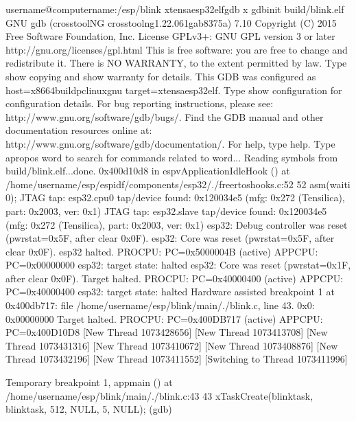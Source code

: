 \documentclass[a4paper,12pt,english]{sphinxmanual}
\begin{document}
\begin{enumerate}
\begin{sphinxVerbatim}[commandchars=\\\{\}]
user\PYGZhy{}name@computer\PYGZhy{}name:\PYGZti{}/esp/blink\PYGZdl{} xtensa\PYGZhy{}esp32\PYGZhy{}elf\PYGZhy{}gdb \PYGZhy{}x gdbinit build/blink.elf
GNU gdb (crosstool\PYGZhy{}NG crosstool\PYGZhy{}ng\PYGZhy{}1.22.0\PYGZhy{}61\PYGZhy{}gab8375a) 7.10
Copyright (C) 2015 Free Software Foundation, Inc.
License GPLv3+: GNU GPL version 3 or later \PYGZlt{}http://gnu.org/licenses/gpl.html\PYGZgt{}
This is free software: you are free to change and redistribute it.
There is NO WARRANTY, to the extent permitted by law.  Type \PYGZdq{}show copying\PYGZdq{}
and \PYGZdq{}show warranty\PYGZdq{} for details.
This GDB was configured as \PYGZdq{}\PYGZhy{}\PYGZhy{}host=x86\PYGZus{}64\PYGZhy{}build\PYGZus{}pc\PYGZhy{}linux\PYGZhy{}gnu \PYGZhy{}\PYGZhy{}target=xtensa\PYGZhy{}esp32\PYGZhy{}elf\PYGZdq{}.
Type \PYGZdq{}show configuration\PYGZdq{} for configuration details.
For bug reporting instructions, please see:
\PYGZlt{}http://www.gnu.org/software/gdb/bugs/\PYGZgt{}.
Find the GDB manual and other documentation resources online at:
\PYGZlt{}http://www.gnu.org/software/gdb/documentation/\PYGZgt{}.
For help, type \PYGZdq{}help\PYGZdq{}.
Type \PYGZdq{}apropos word\PYGZdq{} to search for commands related to \PYGZdq{}word\PYGZdq{}...
Reading symbols from build/blink.elf...done.
0x400d10d8 in esp\PYGZus{}vApplicationIdleHook () at /home/user\PYGZhy{}name/esp/esp\PYGZhy{}idf/components/esp32/./freertos\PYGZus{}hooks.c:52
52          asm(\PYGZdq{}waiti 0\PYGZdq{});
JTAG tap: esp32.cpu0 tap/device found: 0x120034e5 (mfg: 0x272 (Tensilica), part: 0x2003, ver: 0x1)
JTAG tap: esp32.slave tap/device found: 0x120034e5 (mfg: 0x272 (Tensilica), part: 0x2003, ver: 0x1)
esp32: Debug controller was reset (pwrstat=0x5F, after clear 0x0F).
esp32: Core was reset (pwrstat=0x5F, after clear 0x0F).
esp32 halted. PRO\PYGZus{}CPU: PC=0x5000004B (active)    APP\PYGZus{}CPU: PC=0x00000000
esp32: target state: halted
esp32: Core was reset (pwrstat=0x1F, after clear 0x0F).
Target halted. PRO\PYGZus{}CPU: PC=0x40000400 (active)    APP\PYGZus{}CPU: PC=0x40000400
esp32: target state: halted
Hardware assisted breakpoint 1 at 0x400db717: file /home/user\PYGZhy{}name/esp/blink/main/./blink.c, line 43.
0x0:    0x00000000
Target halted. PRO\PYGZus{}CPU: PC=0x400DB717 (active)    APP\PYGZus{}CPU: PC=0x400D10D8
[New Thread 1073428656]
[New Thread 1073413708]
[New Thread 1073431316]
[New Thread 1073410672]
[New Thread 1073408876]
[New Thread 1073432196]
[New Thread 1073411552]
[Switching to Thread 1073411996]

Temporary breakpoint 1, app\PYGZus{}main () at /home/user\PYGZhy{}name/esp/blink/main/./blink.c:43
43      xTaskCreate(\PYGZam{}blink\PYGZus{}task, \PYGZdq{}blink\PYGZus{}task\PYGZdq{}, 512, NULL, 5, NULL);
(gdb)
\end{sphinxVerbatim}

\end{enumerate}
\end{document}
